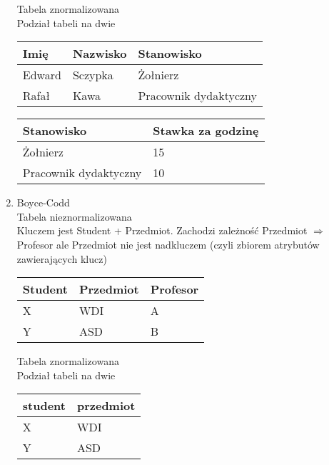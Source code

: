 \documentclass[main.tex]{subfiles}
\begin{document}
\begin{enumerate}
        Tabela znormalizowana\\
        Podział tabeli na dwie

        \begin{table}[H]
            \begin{tabular}{|l|l|l|}
                \hline
                Imię & Nazwisko & Stanowisko            \\ \hline
                Edward & Sczypka & Żołnierz               \\ \hline
                Rafał & Kawa & Pracownik dydaktyczny \\ \hline
            \end{tabular}
        \end{table}

        \begin{table}[H]
            \begin{tabular}{|l|l|}
                \hline
                Stanowisko & Stawka za godzinę \\ \hline
                Żołnierz & 15                \\ \hline
                Pracownik dydaktyczny & 10                \\ \hline
            \end{tabular}
        \end{table}

        \item{Boyce-Codd}\\
        Tabela nieznormalizowana\\
        Kluczem jest Student + Przedmiot. Zachodzi zależność Przedmiot $\Rightarrow$ Profesor ale Przedmiot nie jest nadkluczem (czyli zbiorem atrybutów zawierających klucz)

        \begin{table}[H]
            \begin{tabular}{|l|l|l|}
                \hline
                \textbf{Student} & \textbf{Przedmiot} & Profesor \\ \hline
                X & WDI & A        \\ \hline
                Y & ASD & B        \\ \hline
            \end{tabular}
        \end{table}

        Tabela znormalizowana\\
        Podział tabeli na dwie

        \begin{table}[H]
            \begin{tabular}{|l|l|}
                \hline
                student & przedmiot \\ \hline
                X & WDI       \\ \hline
                Y & ASD       \\ \hline
            \end{tabular}
        \end{table}


\end{enumerate}
\end{document}
